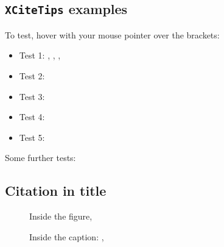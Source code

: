\documentclass[11pt,a4paper,twocolumn]{article}
\begin{document}
\subsection*{\texttt{XCiteTips} examples
\cite[using refs:][]{Einstein:1916vd,Misner:1974qy,Wigner:1939cj}}

To test, hover with your mouse pointer over the brackets:

\begin{itemize}
  \item Test 1: 
    \cite{Einstein:1916vd}, \cite{Misner:1974qy}, \cite{Wigner:1939cj}, 
    \cite{Weinberg:1995mt}
  \item Test 2: 
    \cite{York:1972sj,Gibbons:1976ue,Hawking:1995fd}
  \renewcommand{\xcpmarkitem}[1]{[\textbf{#1}]}
  \item Test 3: 
    \cite[post]{Misner:1974qy,Wigner:1939cj,Hawking:1995fd}
  \item Test 4: 
    \cite[pre][post]{Schmidt-May:2015vnx,Hinterbichler:2011tt,deRham:2014zqa}
  \renewcommand{\xcpmarkitem}[1]{\textbullet}
  \item Test 5: 
    \cite[pre][]{Rosen:1975kk,Isham:1971gm}
\end{itemize}

\noindent Some further tests:

\subsection*{Citation \cite{Aragone:1971kh,Chamseddine:1978yu,Damour:2002ws} 
in title}

\begin{figure}[H]
  Inside the figure, \cite{Einstein:1916vd} 
  \caption{Inside the caption: \cite{Einstein:1916vd} 
  , 
  \cite{Misner:1974qy,Wigner:1939cj,Weinberg:1995mt}}
\end{figure}



\end{document}
